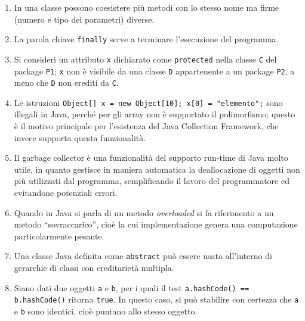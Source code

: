 \documentclass[a4paper,12pt]{article}
\begin{document}
\begin{enumerate}[label=\textbf{\Alph*.}, leftmargin=*, itemsep=0.5em]

\item In una classe possono coesistere più metodi con lo stesso nome ma firme
      (numero e tipo dei parametri) diverse.

\item La parola chiave \texttt{finally} serve a terminare l'esecuzione del programma.

\item Si consideri un attributo \texttt{x} dichiarato come \texttt{protected} nella classe
      \texttt{C} del package \texttt{P1}; \texttt{x} non è visibile da una classe \texttt{D}
      appartenente a un package \texttt{P2}, a meno che \texttt{D} non erediti da \texttt{C}.

\item Le istruzioni \texttt{Object[] x = new Object[10]; x[0] = "elemento";} sono
      illegali in Java, perché per gli array non è supportato il polimorfismo; questo è il
      motivo principale per l'esistenza del Java Collection Framework, che invece supporta
      questa funzionalità.

\item Il garbage collector è una funzionalità del supporto run-time di Java molto utile,
      in quanto gestisce in maniera automatica la deallocazione di oggetti non più utilizzati
      dal programma, semplificando il lavoro del programmatore ed evitandone potenziali errori.

\item Quando in Java si parla di un metodo \emph{overloaded} si fa riferimento a un metodo
      ``sovraccarico'', cioè la cui implementazione genera una computazione particolarmente pesante.

\item Una classe Java definita come \texttt{abstract} può essere usata all'interno di
      gerarchie di classi con ereditarietà multipla.

\item Siano dati due oggetti \texttt{a} e \texttt{b}, per i quali il test
      \texttt{a.hashCode() == b.hashCode()} ritorna \texttt{true}. In questo caso, si può
      stabilire con certezza che \texttt{a} e \texttt{b} sono identici, cioè puntano allo
      stesso oggetto.

\end{enumerate}
\end{document}
